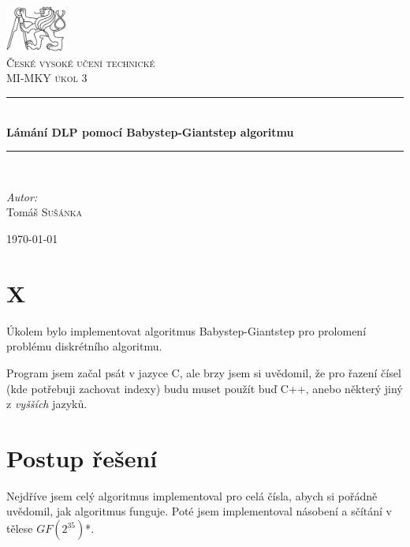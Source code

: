 \documentclass[czech,a4paper,11pt]{article}
\newcommand{\HRule}{\rule{\linewidth}{0.5mm}}
\begin{document}
\begin{titlepage}
\begin{center}

\includegraphics[width=0.15\textwidth]{./cvut-logo-bw.pdf}~\\[1cm]

\textsc{\LARGE České vysoké učení technické }\\[1.5cm]

\textsc{\Large MI-MKY úkol 3}\\[0.5cm]

\HRule \\[0.4cm]
{ \huge \bfseries Lámání DLP pomocí Babystep-Giantstep algoritmu \\[0.4cm] }

\HRule \\[1.5cm]

\begin{minipage}{0.4\textwidth}
\begin{flushleft} \large
\emph{Autor:}\\
Tomáš \textsc{Sušánka}
\end{flushleft}
\end{minipage}

\vfill

{\large \today}

\end{center}
\end{titlepage}


\newpage
\tableofcontents

\newpage
\section{X}
Úkolem bylo implementovat algoritmus Babystep-Giantstep pro prolomení problému diskrétního algoritmu.

Program jsem začal psát v jazyce C, ale brzy jsem si uvědomil, že pro řazení čísel (kde potřebuji zachovat indexy) budu muset použít buď C++, anebo některý jiný z \textit{vyšších} jazyků.


\section{Postup řešení}
Nejdříve jsem celý algoritmus implementoval pro celá čísla, abych si pořádně uvědomil, jak algoritmus funguje. Poté jsem implementoval násobení a sčítání v tělese $GF(2^{35})$\mbox{*}.
\end{document}
